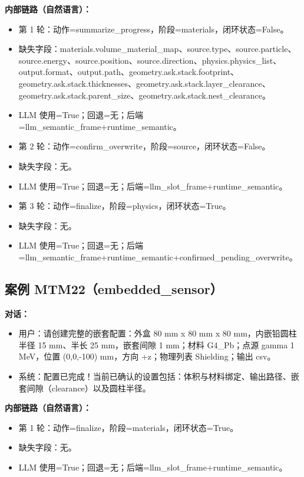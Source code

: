 \documentclass[11pt]{ctexart}
\begin{document}
\textbf{内部链路（自然语言）：}
\begin{itemize}
\item 第 1 轮：动作=summarize\_progress，阶段=materials，闭环状态=False。
\item 缺失字段：materials.volume\_material\_map、source.type、source.particle、source.energy、source.position、source.direction、physics.physics\_list、output.format、output.path、geometry.ask.stack.footprint、geometry.ask.stack.thicknesses、geometry.ask.stack.layer\_clearance、geometry.ask.stack.parent\_size、geometry.ask.stack.nest\_clearance。
\item LLM 使用=True；回退=无；后端=llm\_semantic\_frame+runtime\_semantic。
\item 第 2 轮：动作=confirm\_overwrite，阶段=source，闭环状态=False。
\item 缺失字段：无。
\item LLM 使用=True；回退=无；后端=llm\_slot\_frame+runtime\_semantic。
\item 第 3 轮：动作=finalize，阶段=physics，闭环状态=True。
\item 缺失字段：无。
\item LLM 使用=True；回退=无；后端=llm\_semantic\_frame+runtime\_semantic+confirmed\_pending\_overwrite。
\end{itemize}
\subsection{案例 MTM22（embedded\_sensor）}
\textbf{对话：}
\begin{itemize}
\item 用户：请创建完整的嵌套配置：外盒 80 mm x 80 mm x 80 mm，内嵌铅圆柱半径 15 mm、半长 25 mm，嵌套间隙 1 mm；材料 G4\_Pb；点源 gamma 1 MeV，位置 (0,0,-100) mm，方向 +z；物理列表 Shielding；输出 csv。
\item 系统：配置已完成！当前已确认的设置包括：体积与材料绑定、输出路径、嵌套间隙（clearance）以及圆柱半径。
\end{itemize}
\textbf{内部链路（自然语言）：}
\begin{itemize}
\item 第 1 轮：动作=finalize，阶段=materials，闭环状态=True。
\item 缺失字段：无。
\item LLM 使用=True；回退=无；后端=llm\_slot\_frame+runtime\_semantic。
\end{itemize}
\end{document}
